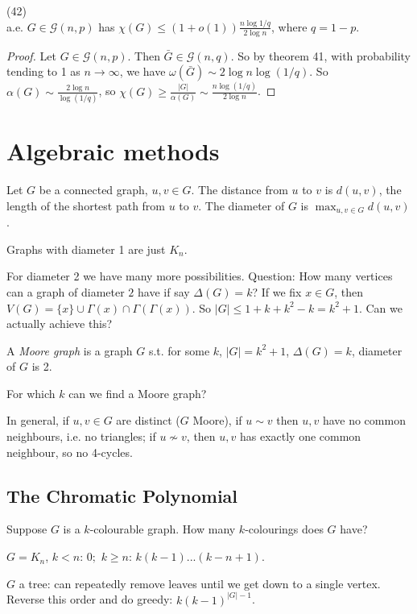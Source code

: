 \documentclass[a4paper]{article}
\begin{document}
\begin{coro} (42)\\
a.e. $G \in \mathcal{G}(n,p)$ has $\chi(G) \leq (1+o(1)) \frac{n\log{1/q}}{2\log n}$, where $q = 1-p$.
\begin{proof}
Let $G \in \mathcal{G}(n,p)$. Then $\bar{G} \in \mathcal{G}(n,q)$. So by theorem 41, with probability tending to 1 as $n \to \infty$, we have $\omega(\bar{G}) \sim {2\log n}{\log (1/q)}$. So $\alpha(G) \sim \frac{2\log n}{\log (1/q)}$, so $\chi(G) \geq \frac{|G|}{\alpha(G)} \sim \frac{n\log (1/q)}{2\log n}$.
\end{proof}
\end{coro}

\newpage

\section{Algebraic methods}
Let $G$ be a connected graph, $u,v \in G$. The distance from $u$ to $v$ is $d(u,v)$, the length of the shortest path from $u$ to $v$. The diameter of $G$ is $\max_{u,v \in G} d(u,v)$.

Graphs with diameter 1 are just $K_n$.

For diameter 2 we have many more possibilities. Question: How many vertices can a graph of diameter $2$ have if say $\Delta(G) = k$? If we fix $x \in G$, then $V(G) = \{x\} \cup \Gamma(x) \cap \Gamma(\Gamma(x))$. So $|G| \leq 1 + k + k^2-k = k^2+1$. Can we actually achieve this?

\begin{defi}
A \emph{Moore graph} is a graph $G$ s.t. for some $k$, $|G| = k^2+1$, $\Delta(G) = k$, diameter of $G$ is 2. 
\end{defi}

For which $k$ can we find a Moore graph?

In general, if $u,v \in G$ are distinct ($G$ Moore), if $u \sim v$ then $u,v$ have no common neighbours, i.e. no triangles; if $u \not\sim v$, then $u,v$ has exactly one common neighbour, so no 4-cycles.

\subsection{The Chromatic Polynomial}
Suppose $G$ is a $k$-colourable graph. How many $k$-colourings does $G$ have?

\begin{eg}
$G = K_n$, $k < n$: $0;$ $k \geq n$: $k(k-1)...(k-n+1)$.

$G$ a tree: can repeatedly remove leaves until we get down to a single vertex. Reverse this order and do greedy: $k(k-1)^{|G|-1}$.
\end{eg}
\end{document}
